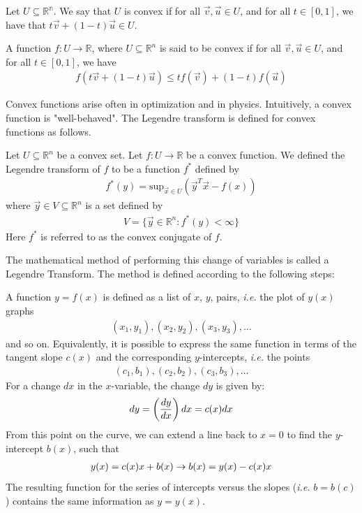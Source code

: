 \documentclass[book.tex]{subfiles}
\begin{document}
Let $U \subseteq \mathbb{R^n}$. We say that $U$ is convex if for all $\vec{v}, \vec{u} \in U$, and for all $t \in [0, 1]$, we have that $t\vec{v} + (1-t)\vec{u} \in U$.


A function $f: U \to \mathbb{R}$, where $U \subseteq \mathbb{R}^n$ is said to be convex if for all $\vec{v}, \vec{u} \in U$, and for all $t \in [0, 1]$, we have
\begin{align}
f(t\vec{v} + (1-t)\vec{u}) \leq tf(\vec{v}) + (1-t)f(\vec{u})
\end{align}


Convex functions arise often in optimization and in physics. Intuitively, a convex function is "well-behaved". The Legendre transform is defined for convex functions as follows.

Let $U \subseteq \mathbb{R}^n$ be a convex set. Let $f: U \to \mathbb{R}$ be a convex function. We defined the Legendre transform of $f$ to be a function $f^*$ defined by 
\begin{align}
f^*(y) = \mathrm{sup}_{\vec{x} \in U} \left (\vec{y}^T\vec{x} - f(x) \right )
\end{align}
where $\vec{y} \in V \subseteq \mathbb{R}^n$ is a set defined by
\begin{align}
V = \{\vec{y} \in \mathbb{R}^n : f^*(y) < \infty \}
\end{align}
Here $f^*$ is referred to as the convex conjugate of $f$.

The mathematical method of performing this change of variables is called a Legendre Transform. The method is defined according to the following steps:

A function $y=f(x)$ is defined as a list of $x$, $y$, pairs, \textit{i.e.} the plot of $y(x)$ graphs 
\begin{align} 
(x_1,y_1), (x_2,y_2), (x_3,y_3), \dotsc 
\end{align} 
and so on. Equivalently, it is possible to express the same function in terms of the tangent slope $c(x)$ and the corresponding $y$-intercepts, \textit{i.e.} the points 
\begin{align}
(c_1,b_1), (c_2,b_2), (c_3,b_3),\dotsc
\end{align}
For a change $dx$ in the $x$-variable, the change $dy$ is given by:
\begin{align}
dy = \left(\frac{dy}{dx}\right)dx = c(x)dx \notag
\end{align} 
From this point on the curve, we can extend a line back to $x = 0$ to find the $y$-intercept $b(x)$, such that
\begin{align}
y(x) = c(x)x+b(x) \rightarrow b(x) = y(x)-c(x)x \notag
\end{align}
The resulting function for the series of intercepts versus the slopes (\textit{i.e.} $b = b(c)$) contains the same information as $y = y(x)$.
\end{document}
